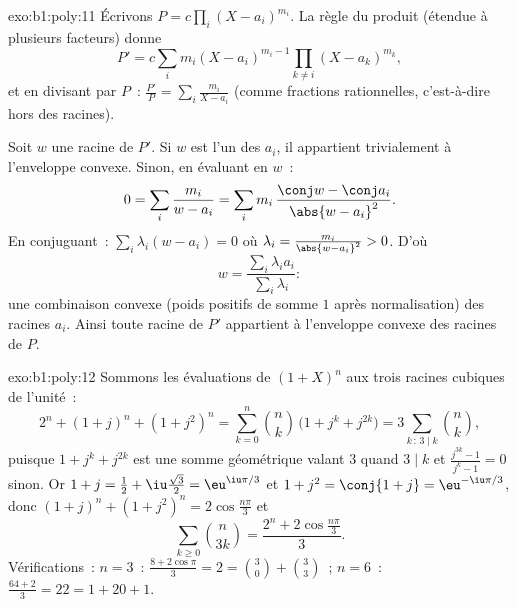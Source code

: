 \begin{solution}{exo:b1:poly:11}
Écrivons $P = c\prod_i (X - a_i)^{m_i}$. La règle du produit (étendue à
plusieurs facteurs) donne
\[
P' = c\sum_{i} m_i (X - a_i)^{m_i - 1} \prod_{k \neq i} (X -
a_k)^{m_k},
\]
et en divisant par $P$~: $\frac{P'}{P} = \sum_i \frac{m_i}{X - a_i}$
(comme fractions rationnelles, c'est-à-dire hors des racines).

Soit $w$ une racine de $P'$. Si $w$ est l'un des $a_i$, il appartient
trivialement à l'enveloppe convexe. Sinon, en évaluant en $w$~:
\[
0 = \sum_i \frac{m_i}{w - a_i}
= \sum_i m_i\, \frac{\conj w - \conj a_i}{\abs{w - a_i}^2} .
\]
En conjuguant~: $\sum_i \lambda_i (w - a_i) = 0$ où $\lambda_i =
\frac{m_i}{\abs{w - a_i}^2} > 0$. D'où
\[
w = \frac{\sum_i \lambda_i a_i}{\sum_i \lambda_i} :
\]
une combinaison convexe (poids positifs de somme $1$ après
normalisation) des racines $a_i$. Ainsi toute racine de $P'$ appartient
à l'enveloppe convexe des racines de $P$.
\end{solution}

\begin{solution}{exo:b1:poly:12}
Sommons les évaluations de $(1 + X)^n$ aux trois racines cubiques de
l'unité~:
\[
2^n + (1 + j)^n + (1 + j^2)^n
= \sum_{k=0}^n \binom nk\,\bigl(1 + j^k + j^{2k}\bigr)
= 3\sum_{k\,:\,3\mid k}\binom nk ,
\]
puisque $1 + j^k + j^{2k}$ est une somme géométrique valant $3$ quand
$3 \mid k$ et $\frac{j^{3k} - 1}{j^k - 1} = 0$ sinon. Or $1 + j =
\frac12 + \iu\frac{\sqrt3}2 = \eu^{\iu\pi/3}$ et $1 + j^2 = \conj{1 +
j} = \eu^{-\iu\pi/3}$, donc $(1+j)^n + (1+j^2)^n = 2\cos\frac{n\pi}3$
et
\[
\sum_{k\geq0}\binom n{3k} = \frac{2^n + 2\cos\frac{n\pi}3}{3} .
\]
Vérifications~: $n = 3$~: $\frac{8 + 2\cos\pi}3 = 2 = \binom30 +
\binom33$~; $n = 6$~: $\frac{64 + 2}3 = 22 = 1 + 20 + 1$.
\end{solution}

